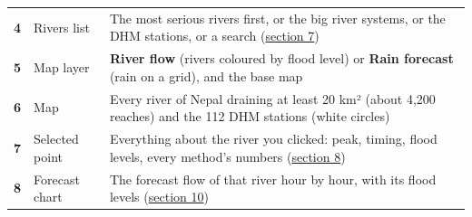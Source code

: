 \documentclass[
  10pt,
]{article}
\begin{document}
\begin{longtable}[]{@{}lll@{}}
\begin{minipage}[t]{0.30\columnwidth}
\textbf{4}\strut
\end{minipage} & \begin{minipage}[t]{0.30\columnwidth}\raggedright
Rivers list\strut
\end{minipage} & \begin{minipage}[t]{0.30\columnwidth}\raggedright
The most serious rivers first, or the big river systems, or the DHM
stations, or a search
(\protect\hyperlink{7-the-rivers-list-hotspots-basins-stations-search}{section
7})\strut
\end{minipage}\tabularnewline
\begin{minipage}[t]{0.30\columnwidth}\raggedright
\textbf{5}\strut
\end{minipage} & \begin{minipage}[t]{0.30\columnwidth}\raggedright
Map layer\strut
\end{minipage} & \begin{minipage}[t]{0.30\columnwidth}\raggedright
\textbf{River flow} (rivers coloured by flood level) or \textbf{Rain
forecast} (rain on a grid), and the base map\strut
\end{minipage}\tabularnewline
\begin{minipage}[t]{0.30\columnwidth}\raggedright
\textbf{6}\strut
\end{minipage} & \begin{minipage}[t]{0.30\columnwidth}\raggedright
Map\strut
\end{minipage} & \begin{minipage}[t]{0.30\columnwidth}\raggedright
Every river of Nepal draining at least 20 km² (about 4,200 reaches) and
the 112 DHM stations (white circles)\strut
\end{minipage}\tabularnewline
\begin{minipage}[t]{0.30\columnwidth}\raggedright
\textbf{7}\strut
\end{minipage} & \begin{minipage}[t]{0.30\columnwidth}\raggedright
Selected point\strut
\end{minipage} & \begin{minipage}[t]{0.30\columnwidth}\raggedright
Everything about the river you clicked: peak, timing, flood levels,
every method's numbers
(\protect\hyperlink{8-selected-point-everything-shown-when-you-click-a-river}{section
8})\strut
\end{minipage}\tabularnewline
\begin{minipage}[t]{0.30\columnwidth}\raggedright
\textbf{8}\strut
\end{minipage} & \begin{minipage}[t]{0.30\columnwidth}\raggedright
Forecast chart\strut
\end{minipage} & \begin{minipage}[t]{0.30\columnwidth}\raggedright
The forecast flow of that river hour by hour, with its flood levels
(\protect\hyperlink{10-the-forecast-chart-hydrograph}{section 10})\strut
\end{minipage}\tabularnewline
\bottomrule
\end{longtable}
\end{document}
